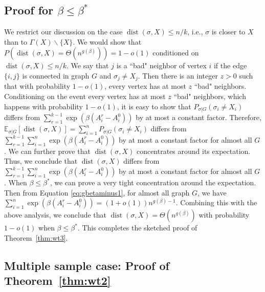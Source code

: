 \label{key}\documentclass[conference]{IEEEtran}
\DeclareMathOperator{\dist}{dist}
\begin{document}
\subsection{Proof for $\beta\le\beta^\ast$}\label{subsect:smaller}
We restrict our discussion on the case $\dist(\sigma,X)\le n/k$, i.e., $\sigma$ is closer to $X$ than to $\Gamma(X)\backslash\{X\}$.
We would show that $P(\dist(\sigma, X) = \Theta(n^{g(\beta)})) = 1 - o(1)$ conditioned on $\dist(\sigma,X)\le n/k$.
We say that $j$ is a ``bad" neighbor of vertex $i$ if the edge $\{i,j\}$ is connected in graph $G$ and $\sigma_j\neq X_j$. Then there is an integer $z>0$ such that with probability $1-o(1)$, every vertex has at most $z$ ``bad" neighbors.
Conditioning on the event every vertex has at most $z$ ``bad" neighbors, which happens with probability $1-o(1)$, it is easy to show that $P_{\sigma|G}(\sigma_i \neq X_i)$ differs from $\sum_{r=1}^{k-1}\exp (\beta (A^r_i-A^0_i))$ by at most a constant factor. 
Therefore, $\mathbb{E}_{\sigma|G}[\dist(\sigma,X)]=\sum_{i=1}^n P_{\sigma|G}(\sigma_i \neq X_i)$ differs from
$\sum_{r=1}^{k-1} \sum_{i=1}^n\exp (\beta (A^r_i-A^0_i))$ by at most a constant factor for almost all $G$.
We can further prove that $\dist(\sigma,X)$ concentrates around its expectation.
Thus, we conclude that $\dist(\sigma,X)$ differs from
$\sum_{r=1}^{k-1} \sum_{i=1}^n\exp (\beta (A^r_i-A^0_i))$ by at most a constant factor for almost all $G$.
When $\beta\le\beta^\ast$, we can prove a very tight concentration around the expectation. Then from Equation \eqref{eq:gbetaminus1}, for almost all graph $G$, we have $\sum_{i=1}^n\exp (\beta (A^r_i-A^0_i))=(1+o(1))n^{g(\beta)-1}$.
Combining this with the above analysis,
we conclude that $\dist(\sigma,X)=\Theta(n^{g(\beta)})$ with probability $1-o(1)$ when $\beta\le\beta^\ast$.
This completes the sketched proof of Theorem~\ref{thm:wt3}.

\subsection{Multiple sample case: Proof of Theorem~\ref{thm:wt2}}
\label{sect:multi}
\end{document}

